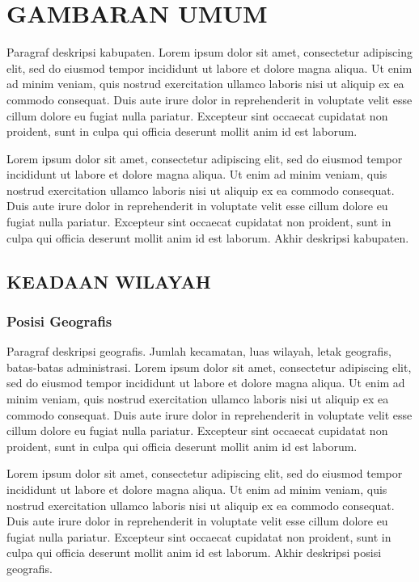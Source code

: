 \chapter{GAMBARAN UMUM}

Paragraf deskripsi kabupaten. Lorem ipsum dolor sit amet, consectetur adipiscing elit, sed do eiusmod tempor incididunt ut labore et dolore magna aliqua. Ut enim ad minim veniam, quis nostrud exercitation ullamco laboris nisi ut aliquip ex ea commodo consequat. Duis aute irure dolor in reprehenderit in voluptate velit esse cillum dolore eu fugiat nulla pariatur. Excepteur sint occaecat cupidatat non proident, sunt in culpa qui officia deserunt mollit anim id est laborum.

Lorem ipsum dolor sit amet, consectetur adipiscing elit, sed do eiusmod tempor incididunt ut labore et dolore magna aliqua. Ut enim ad minim veniam, quis nostrud exercitation ullamco laboris nisi ut aliquip ex ea commodo consequat. Duis aute irure dolor in reprehenderit in voluptate velit esse cillum dolore eu fugiat nulla pariatur. Excepteur sint occaecat cupidatat non proident, sunt in culpa qui officia deserunt mollit anim id est laborum. Akhir deskripsi kabupaten.

\section{KEADAAN WILAYAH}

\subsection{Posisi Geografis}

Paragraf deskripsi geografis. Jumlah kecamatan, luas wilayah, letak geografis, batas-batas administrasi. Lorem ipsum dolor sit amet, consectetur adipiscing elit, sed do eiusmod tempor incididunt ut labore et dolore magna aliqua. Ut enim ad minim veniam, quis nostrud exercitation ullamco laboris nisi ut aliquip ex ea commodo consequat. Duis aute irure dolor in reprehenderit in voluptate velit esse cillum dolore eu fugiat nulla pariatur. Excepteur sint occaecat cupidatat non proident, sunt in culpa qui officia deserunt mollit anim id est laborum.

Lorem ipsum dolor sit amet, consectetur adipiscing elit, sed do eiusmod tempor incididunt ut labore et dolore magna aliqua. Ut enim ad minim veniam, quis nostrud exercitation ullamco laboris nisi ut aliquip ex ea commodo consequat. Duis aute irure dolor in reprehenderit in voluptate velit esse cillum dolore eu fugiat nulla pariatur. Excepteur sint occaecat cupidatat non proident, sunt in culpa qui officia deserunt mollit anim id est laborum. Akhir deskripsi posisi geografis.

